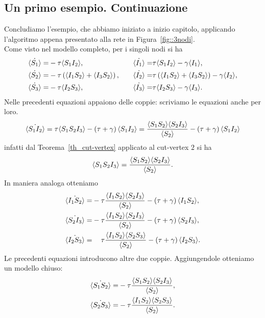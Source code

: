 \subsection{Un primo esempio. Continuazione}
Concludiamo l'esempio, che abbiamo iniziato a inizio capitolo, applicando l'algoritmo appena presentato alla rete in Figura~\ref{fig::3nodi}.\\
Come visto nel modello completo, per i singoli nodi si ha \begin{equation*}
\begin{aligned}
	\dot{\langle S_1 \rangle} = & -\tau \langle  S_1 I_2 \rangle, 
\quad &
	\dot{\langle I_1 \rangle} = & \tau \langle S_1 I_2 \rangle-\gamma \langle I_1 \rangle, 
\\
	\dot{\langle S_2 \rangle} = & -\tau \left(  \langle  I_1 S_2 \rangle + \langle I_3S_2 \rangle \right),	
\quad & 
	\dot{\langle I_2 \rangle} = & \tau \left(  \langle  I_1 S_2 \rangle + \langle I_3S_2 \rangle \right)-\gamma \langle I_2 \rangle,
\\
	\dot{\langle S_3 \rangle} = & -\tau \langle  I_2 S_3 \rangle,
\quad & 
	\dot{\langle I_3 \rangle} = & \tau \langle  I_2 S_3 \rangle-\gamma \langle I_3 \rangle.
 \end{aligned}
\end{equation*}
Nelle precedenti equazioni appaiono delle coppie: scriviamo le equazioni anche per loro.\\
$$\dot{\langle S_1I_2 \rangle}=\tau
\langle S_1S_2I_3 \rangle - \left(  \tau + \gamma \right)\langle S_1 I_2 \rangle = \frac{
\langle S_1S_2 \rangle\langle S_2I_3 \rangle}{\langle S_2 \rangle} - \left(  \tau + \gamma \right)\langle S_1 I_2 \rangle$$ 
infatti  dal Teorema~\ref{th_cut-vertex} applicato al cut-vertex $2$ si ha  
$$ \langle S_1S_2I_3 \rangle = \frac{ \langle S_1S_2 \rangle\langle S_2I_3 \rangle}{\langle S_2 \rangle}.$$ 
In maniera analoga otteniamo 
\begin{equation*}
\begin{aligned}
\dot{\angol{I_1S_2}}=&-\tau\frac{\angol{I_1S_2}\angol{S_2I_3}}{\angol{S_2}} - \tonde{ \tau + \gamma}\angol{I_1 S_2},
\\
\dot{\angol{S_2I_3}}=&-\tau\frac{\angol{I_1S_2}\angol{S_2I_3}}{\angol{S_2}} - \tonde{ \tau + \gamma}\angol{S_2 I_3},
\\
\dot{\angol{I_2S_3}}=&\spa\tau\frac{\angol{I_1S_2}\angol{S_2S_3}}{\angol{S_2}} - \tonde{ \tau + \gamma}\angol{I_2 S_3}.
\end{aligned}
\end{equation*}
Le precedenti equazioni introducono altre due coppie. Aggiungendole otteniamo un modello chiuso: 
\begin{equation*}
\begin{aligned}
\dot{\langle S_1S_2 \rangle} = &- \tau\frac{\langle S_1S_2 \rangle\langle S_2I_3 \rangle}{\langle S_2 \rangle},\\
\dot{\langle S_2S_3 \rangle}= & -\tau \frac{\langle  I_1 S_2 \rangle\langle S_2S_3 \rangle}{\langle S_2 \rangle}.
	\end{aligned}	
\end{equation*}
